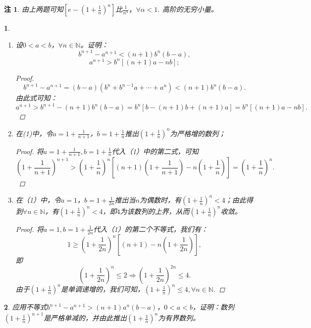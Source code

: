 \documentclass[utf8]{book}
\newtheorem{example}{}[section]             %
\newtheorem{remark}{注}
\begin{document}
\begin{remark}
由上两题可知$\left[e-\left(1+\frac{1}{n}\right)^n\right]$比$\frac{1}{n^{\alpha}}，\forall \alpha < 1$.
高阶的无穷小量。
\end{remark}
\begin{example}
\renewcommand\labelenumi{\normalfont(\theenumi)}
\begin{enumerate}
\item 设$0<a<b$，$\forall n\in\mathbb{N}$。证明：
$$b^{n+1}-a^{n+1}< (n+1)b^n(b-a),$$
$$a^{n+1}>b^n\left[(n+1)a-nb\right];$$
\begin{proof}
$$b^{n+1}-a^{n+1}=(b-a)(b^{n}+b^{n-1}a+\cdots+a^n) < (n+1)b^n(b-a).$$
由此式可知：
$$a^{n+1} > b^{n+1}-(n+1)b^n(b-a) = b^n\left[b-(n+1)b +(n+1)a\right] = b^n\left[(n+1)a -nb\right].$$
\end{proof}
\item 在(1)中，令$a=1+\displaystyle\frac{1}{n+1}$，$b=1+\displaystyle\frac{1}{n}$推出$\left(1+\frac{1}{n}\right)^n$为严格增的数列；
\begin{proof}
将$a=1+\displaystyle\frac{1}{n+1}, b = 1+\displaystyle\frac{1}{n}$代入（1）中的第二式，可知 
$$\left(1+\frac{1}{n+1}\right)^{n+1} > \left(1+\frac{1}{n}\right)^n\left[(n+1)\left(1+\frac{1}{n+1}\right)
-n\left(1+\frac{1}{n}\right)\right]=\left(1+\frac{1}{n}\right)^n.$$
\end{proof}
\item 在（1）中，令$a=1$，$b=1+\frac{1}{2n}$推出当$n$为偶数时，有$\left(1+\frac{1}{n}\right)^n<4$；由此得到$\forall n\in\mathbb{N}$，有$\left(1+\frac{1}{n}\right)^n<4$，即$4$为该数列的上界，从而$\left(1+\frac{1}{n}\right)^n$收敛。
\begin{proof}
将$a=1, b=1+\displaystyle\frac{1}{2n}$代入（1）的第二个不等式，我们有：
$$1\geq \left(1+\frac{1}{2n}\right)^n\left[(n+1) - n\left(1+\frac{1}{2n}\right)\right],$$
即
$$\left(1+\frac{1}{2n}\right)^n \leq 2\Rightarrow \left(1+\frac{1}{2n}\right)^{2n} \leq 4.$$
由于$\left(1+\frac{1}{n}\right)^n$是单调递增的，我们可知，$\left(1+\frac{1}{n}\right)^{n} \leq 4, \forall n\in\mathbb{N}$.
\end{proof}
\end{enumerate}
\end{example}
\begin{example}
应用不等式$b^{n+1}-a^{n+1}>(n+1)a^n(b-a)$，$0<a<b$，证明：数列$\left(1+\frac{1}{n}\right)^{n+1}$是严格单减的，并由此推出$\left(1+\frac{1}{n}\right)^{n}$为有界数列。
\end{example}
\end{document}
